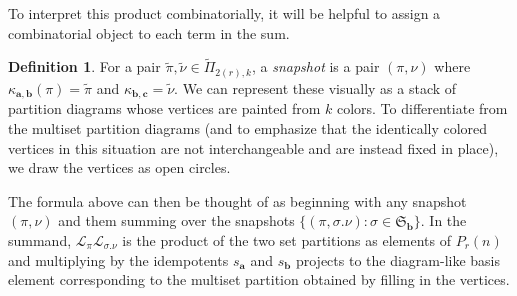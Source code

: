 \documentclass[10pt]{amsart}
\theoremstyle{definition}
\newtheorem{defi}[defi]{Definition}
\theoremstyle{definition}
\theoremstyle{plain}
\theoremstyle{remark}
\theoremstyle{plain}
\theoremstyle{plain}
\newcommand{\LL}{\mathcal{L}}
\newcommand{\SG}{\mathfrak{S}}
\newcommand{\bfa}{{\boldsymbol{a}}}
\newcommand{\bfb}{{\boldsymbol{b}}}
\newcommand{\bfc}{{\boldsymbol{c}}}
\newcommand{\tpi}{{\tilde{\pi}}}
\newcommand{\tnu}{{\tilde{\nu}}}
\newcommand{\defn}[1]{\textcolor{defncolor}{\emph{#1}}}
\begin{document}
To interpret this product combinatorially, it will be helpful to assign a combinatorial object to each term in the sum.

\begin{defi}\label{def:snapshot}
    For a pair $\tpi,\tnu\in\tilde\Pi_{2(r),k}$, a \defn{snapshot} is a pair $(\pi,\nu)$ where $\kappa_{\bfa,\bfb}(\pi)=\tpi$ and $\kappa_{\bfb,\bfc}=\tnu$. We can represent these visually as a stack of partition diagrams whose vertices are painted from $k$ colors. To differentiate from the multiset partition diagrams (and to emphasize that the identically colored vertices in this situation are not interchangeable and are instead fixed in place), we draw the vertices as open circles.
\end{defi}

  The formula above can then be thought of as beginning with any snapshot $(\pi,\nu)$ and them summing over the snapshots $\{(\pi,\sigma.\nu):\sigma\in\SG_\bfb\}$. In the summand, $\LL_\pi\LL_{\sigma.\nu}$ is the product of the two set partitions as elements of $P_r(n)$ and multiplying by the idempotents $s_\bfa$ and $s_\bfb$ projects to the diagram-like basis element corresponding to the multiset partition obtained by filling in the vertices.
\end{document}
